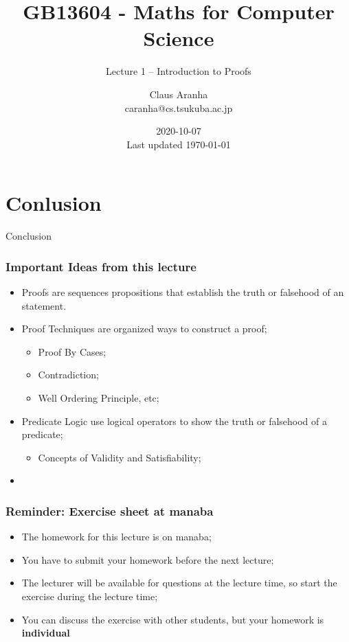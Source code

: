 \documentclass[aspectratio=169]{beamer}
\title[GB13604]{GB13604 - Maths for Computer Science}
\subtitle[]{Lecture 1 -- Introduction to Proofs}
\author[Claus Aranha]{Claus Aranha\\{\footnotesize caranha@cs.tsukuba.ac.jp}}
\institute[COINS]{College of Information Science}
\date[2020-10-07]{2020-10-07\\{\tiny Last updated \today}}
\begin{document}
\begin{frame}
  \maketitle
\end{frame}






\section{Conlusion}

\begin{frame}
  \begin{center}
    Conclusion
  \end{center}
\end{frame}

\begin{frame}
  \frametitle{Important Ideas from this lecture}
  \begin{itemize}
  \item Proofs are sequences propositions that establish the truth or falsehood of an statement.
  \item Proof Techniques are organized ways to construct a proof;
  \begin{itemize}
    \item Proof By Cases;
    \item Contradiction;
    \item Well Ordering Principle, etc;
  \end{itemize}
  \item Predicate Logic use logical operators to show the truth or falsehood of a predicate;
  \begin{itemize}
    \item Concepts of Validity and Satisfiability;
  \end{itemize}
  \item {}
  \end{itemize}
\end{frame}

\begin{frame}
  \frametitle{Reminder: Exercise sheet at manaba}

  \begin{itemize}
    \item The homework for this lecture is on manaba;
    \item You have to submit your homework before the next lecture;
    \item The lecturer will be available for questions at the lecture time, so start the exercise during the lecture time;
    \item You can discuss the exercise with other students, but your homework is {\bf individual}
  \end{itemize}
\end{frame}


\end{document}
